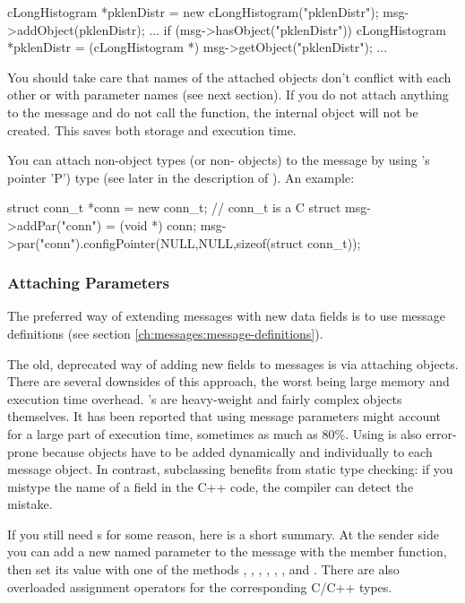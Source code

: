\begin{cpp}
cLongHistogram *pklenDistr = new cLongHistogram("pklenDistr");
msg->addObject(pklenDistr);
...
if (msg->hasObject("pklenDistr"))
{
   cLongHistogram *pklenDistr =
       (cLongHistogram *) msg->getObject("pklenDistr");
   ...
}
\end{cpp}

You should take care that names of the attached objects don't
conflict with each other or with  parameter names
(see next section).
If you do not attach anything to the message and do not call the
 function, the internal  object
will not be created. This saves both storage and execution time.

You can attach non-object types (or non- objects) to
the message by using
's  pointer 'P') type (see later in the description
of ). An example:

\begin{cpp}
struct conn_t *conn = new conn_t; // conn_t is a C struct
msg->addPar("conn") = (void *) conn;
msg->par("conn").configPointer(NULL,NULL,sizeof(struct conn_t));
\end{cpp}




\subsubsection{Attaching Parameters}

The preferred way of extending messages with new data fields is to use
message definitions (see section \ref{ch:messages:message-definitions}).

The old, deprecated way of adding new fields to messages is via
attaching  objects.
There are several downsides of this approach, the worst being
large memory and execution time overhead. 's are
heavy-weight and fairly complex objects themselves.
It has been reported that using  message parameters
might account for a large part of execution time, sometimes as much as 80\%.
Using  is also error-prone because  objects
have to be added dynamically and individually to each message object.
In contrast, subclassing benefits from static type checking:
if you mistype the name of a field in the C++ code, the compiler
can detect the mistake.

If you still need s for some reason, here is a short summary.
At the sender side you can add a new named parameter to the message
with the  member function, then set its value with
one of the methods , ,
, , ,
, and . There are also overloaded
assignment operators for the corresponding C/C++ types.

